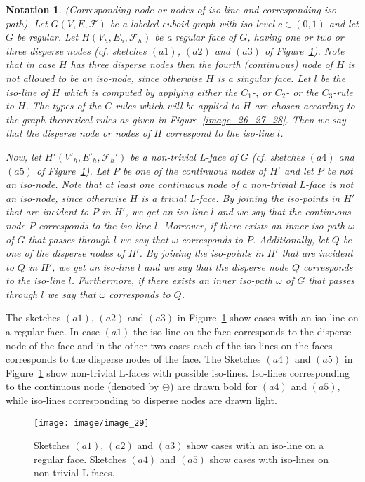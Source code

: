 \documentclass[a4paper,11pt]{article}
\newtheorem{notation}{Notation}
\begin{document}
\begin{notation}(Corresponding node or nodes of iso-line and corresponding iso-path). Let $G(V,E,\mathcal{F})$
be a labeled cuboid graph with iso-level $c\in (0,1)$ and let $G$ be regular. Let $H(V_h,E_h,\mathcal{F}_h)$
be a regular face of $G$, having one or two or three disperse nodes (cf. sketches $(a1)$, $(a2)$ and $(a3)$ of
Figure~\ref{image_29}). Note that in case $H$ has three disperse nodes then the fourth (continuous) node
of $H$ is not allowed to be an iso-node, since otherwise $H$ is a singular face.
Let $l$ be the iso-line of $H$ which is computed by applying either the $C_1$-, or $C_2$- or the
$C_3$-rule to $H$. The types of the $C$-rules which will be applied to $H$ are chosen according to
the graph-theoretical rules as given in Figure~\ref{image_26_27_28}. Then we say that the disperse
node or nodes of $H$ correspond to the iso-line $l$.

Now, let $H'(V'_h,E'_h,\mathcal{F}_h')$ be a non-trivial L-face of $G$ (cf. sketches $(a4)$ and $(a5)$ of
Figure~\ref{image_29}). Let $P$ be one of the continuous nodes of $H'$ and let $P$ be not an iso-node.
Note that at least one continuous node of a non-trivial L-face is not an iso-node, since otherwise $H$ is a
trivial L-face. By joining the iso-points in $H'$ that are incident to $P$ in $H'$, we get an iso-line $l$ and we
say that the continuous node $P$ corresponds to the iso-line $l$. Moreover, if there exists an inner
iso-path $\omega$ of $G$ that passes through $l$ we say that $\omega$ corresponds to $P$. Additionally, let $Q$
be one of the disperse nodes of $H'$. By joining the iso-points in $H'$ that are incident to $Q$ in $H'$, we get
an iso-line $l$ and we say that the disperse node $Q$ corresponds to the iso-line $l$. Furthermore,
if there exists an inner iso-path $\omega$ of $G$ that passes through $l$ we say that $\omega$ corresponds to $Q$.
\label{note:corresponding-node}
\end{notation}
The sketches $(a1)$, $(a2)$ and $(a3)$ in Figure~\ref{image_29} show cases with an iso-line on a regular face. In
case $(a1)$ the iso-line on the face corresponds to the disperse node of the face and in the other two cases
each of the iso-lines on the faces corresponds to the disperse nodes of the face. The Sketches $(a4)$ and
$(a5)$ in Figure~\ref{image_29} show non-trivial L-faces with possible iso-lines. Iso-lines corresponding to
the continuous node (denoted by $\circleddash$) are drawn bold for $(a4)$ and $(a5)$, while iso-lines
corresponding to disperse nodes are drawn light.
\begin{figure}[!ht]
\texttt{[image: image/image\_29]}
\caption{Sketches $(a1)$, $(a2)$ and $(a3)$ show cases with an iso-line on a regular face.
Sketches $(a4)$ and $(a5)$ show cases with iso-lines on non-trivial L-faces.}
\label{image_29}
\end{figure}
\FloatBarrier
\end{document}
